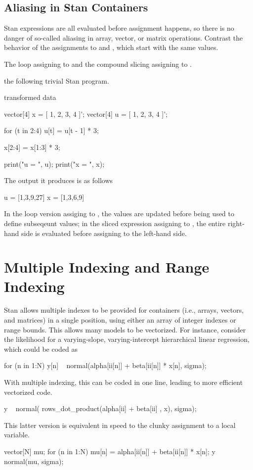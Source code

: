 \section{Aliasing in Stan Containers}

Stan expressions are all evaluated before assignment happens, so there
is no danger of so-called aliasing in array, vector, or matrix
operations.  Contrast the behavior of the assignments to  and
, which start with the same values.

The loop assigning to  and the compound slicing assigning to .

 the following trivial Stan program.

\begin{stancode}
transformed data {
  vector[4] x = [ 1, 2, 3, 4 ]';
  vector[4] u = [ 1, 2, 3, 4 ]';

  for (t in 2:4)
    u[t] = u[t - 1] * 3;

  x[2:4] = x[1:3] * 3;

  print("u = ", u);
  print("x = ", x);
}
\end{stancode}
%
The output it produces is as follows
%
\begin{stancode}
u = [1,3,9,27]
x = [1,3,6,9]
\end{stancode}
%
In the loop version assiging to , the values are updated before being used to
define subseqeunt values;  in the sliced expression assigning to
, the entire right-hand side is evaluated before assigning to
the left-hand side.


\chapter{Multiple Indexing and Range Indexing}\label{multi-indexing.chapter}

\noindent
Stan allows multiple indexes to be provided for containers (i.e.,
arrays, vectors, and matrices) in a single position, using either an
array of integer indexes or range bounds.  This allows many models to
be vectorized.  For instance, consider the likelihood for a varying-slope,
varying-intercept hierarchical linear regression, which could be coded
as
%
\begin{stancode}
for (n in 1:N)
  y[n] ~ normal(alpha[ii[n]] + beta[ii[n]] * x[n], sigma);
\end{stancode}
%
With multiple indexing, this can be coded in one line, leading to more
efficient vectorized code.
%
\begin{stancode}
y ~ normal( rows_dot_product(alpha[ii] + beta[ii] , x), sigma);
\end{stancode}
%
This latter version is equivalent in speed to the clunky assignment to
a local variable.
%
\begin{stancode}
{
  vector[N] mu;
  for (n in 1:N)
    mu[n] = alpha[ii[n]] + beta[ii[n]] * x[n];
  y ~ normal(mu, sigma);
}
\end{stancode}

